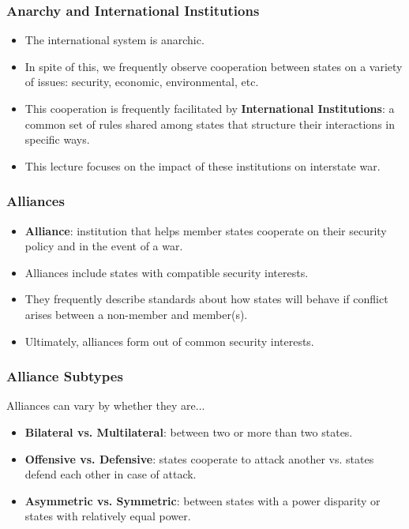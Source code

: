\documentclass{beamer}
\begin{document}
\begin{frame} 
	\frametitle{\LARGE{Anarchy and International Institutions}}
	\begin{itemize}
		\item The international system is anarchic. \pause
		\item In spite of this, we frequently observe cooperation between states on a variety of issues: security, economic, environmental, etc.
		\item This cooperation is frequently facilitated by \textbf{International Institutions}: a common set of rules shared among states that structure their interactions in specific ways. \pause
		\item This lecture focuses on the impact of these institutions on interstate war.
	\end{itemize}
\end{frame}

\begin{frame} 
\frametitle{\LARGE{Alliances}}
	\begin{itemize}
		\item \textbf{Alliance}: institution that helps member states cooperate on their security policy and in the event of a war. \pause 
		\item Alliances include states with compatible security interests. \pause
		\item They frequently describe standards about how states will behave if conflict arises between a non-member and member(s). \pause
		\item Ultimately, alliances form out of common security interests.
	\end{itemize}
\end{frame}


\begin{frame} 
	\frametitle{\LARGE{Alliance Subtypes}}
Alliances can vary by whether they are...
	\begin{itemize}
		\item \textbf{Bilateral vs. Multilateral}: between two or more than two states. \pause
		\item\textbf{Offensive vs. Defensive}: states cooperate to attack another vs. states defend each other in case of attack. \pause
		\item \textbf{Asymmetric vs. Symmetric}: between states with a power disparity or states with relatively equal power.
	\end{itemize}
\end{frame}
\end{document}
